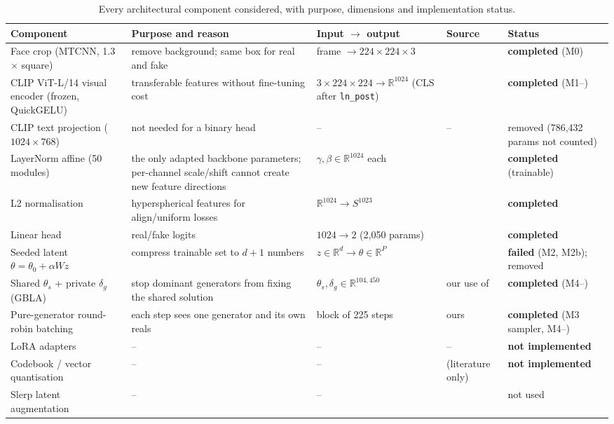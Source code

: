 \documentclass[10pt,a4paper]{article}
\newcommand{\Done}{\textcolor{done}{\textbf{completed}}}
\newcommand{\Fail}{\textcolor{fail}{\textbf{failed}}}
\begin{document}
\begin{table}[H]\centering\scriptsize
\caption{Every architectural component considered, with purpose, dimensions and implementation status.}\label{tab:components}
\begin{tabularx}{\linewidth}{@{}L{2.3cm}YL{2.6cm}L{1.9cm}L{1.6cm}@{}}
\toprule
Component & Purpose and reason & Input \(\to\) output & Source & Status\\
\midrule
Face crop (MTCNN, 1.3\(\times\) square) & remove background; same box for real and fake & frame \(\to 224\times224\times3\) & \cite{zhang2016mtcnn} & \Done{} (M0)\\
CLIP ViT-L/14 visual encoder (frozen, QuickGELU) & transferable features without fine-tuning cost & \(3\times224\times224\to\mathbb{R}^{1024}\) (CLS after \texttt{ln\_post}) & \cite{radford2021clip} & \Done{} (M1--)\\
CLIP text projection (\(1024\times768\)) & not needed for a binary head & -- & -- & removed (786,432 params not counted)\\
LayerNorm affine (50 modules) & the only adapted backbone parameters; per-channel scale/shift cannot create new feature directions & \(\gamma,\beta\in\mathbb{R}^{1024}\) each & \cite{yermakov2025lnclip} & \Done{} (trainable)\\
L2 normalisation & hyperspherical features for align/uniform losses & \(\mathbb{R}^{1024}\to S^{1023}\) & \cite{yermakov2025lnclip} & \Done\\
Linear head & real/fake logits & \(1024\to2\) (2,050 params) & \cite{yermakov2025lnclip} & \Done\\
Seeded latent \(\theta=\theta_0+\alpha Wz\) & compress trainable set to \(d+1\) numbers & \(z\in\mathbb{R}^d\to\theta\in\mathbb{R}^{P}\) & \cite{li2018intrinsic,nooralinejad2023pranc,sen2026mapping} & \Fail{} (M2, M2b); removed\\
Shared \(\theta_s\) + private \(\delta_g\) (GBLA) & stop dominant generators from fixing the shared solution & \(\theta_s,\delta_g\in\mathbb{R}^{104{,}450}\) & our use of \cite{evgeniou2004multitask,piratla2020csd} & \Done{} (M4--)\\
Pure-generator round-robin batching & each step sees one generator and its own reals & block of 225 steps & ours & \Done{} (M3 sampler, M4--)\\
LoRA adapters & -- & -- & -- & \textbf{not implemented}\\
Codebook / vector quantisation & -- & -- & \cite{wang2026breaking} (literature only) & \textbf{not implemented}\\
Slerp latent augmentation & -- & -- & \cite{yermakov2025unlocking} & not used\\
\bottomrule
\end{tabularx}
\end{table}
\end{document}
